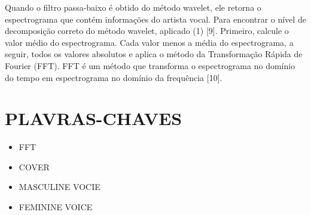 \documentclass{article}
\begin{document}
Quando o filtro passa-baixo é obtido do método wavelet, ele retorna o espectrograma que contém informações do artista vocal.
Para encontrar o nível de decomposição correto do método wavelet, aplicado (1) [9]. Primeiro, calcule o valor médio do espectrograma. Cada valor menos a média do espectrograma, a seguir, todos os valores absolutos e aplica o método da Transformação Rápida de Fourier (FFT). FFT é um método que transforma o espectrograma no domínio do tempo em espectrograma no domínio da frequência [10].
\section{PLAVRAS-CHAVES}
\begin{itemize}
    \item FFT
    \item COVER 
    \item MASCULINE VOCIE
    \item FEMININE VOICE
\end{itemize}
\end{document}
